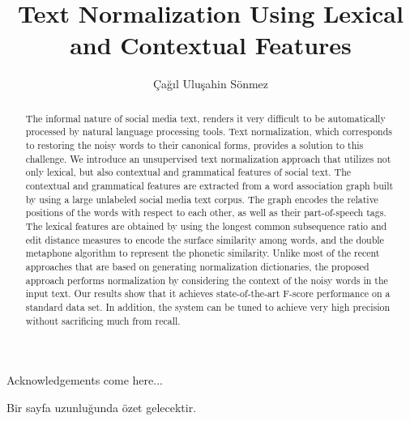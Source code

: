 \documentclass[a4paper,onesided,12pt]{report}
\title{Text Normalization Using Lexical and Contextual Features}
\author{Çağıl Uluşahin Sönmez}
\begin{document}
\makemstitle %
\makeapprovalpage
\begin{acknowledgements}
Acknowledgements come here...
\end{acknowledgements}
\begin{abstract}
The informal nature of social media text, renders it very difficult to be automatically processed by natural language processing tools. Text normalization, which corresponds to restoring the noisy words to their canonical forms, provides a solution to this challenge.
We introduce an unsupervised text normalization approach that utilizes not only lexical, but also contextual and grammatical features of social text.
The contextual and grammatical features are extracted from a word association graph built by using a large unlabeled social media text corpus.
The graph encodes the relative positions of the words with respect to each other, as well as their part-of-speech tags.
The lexical features are obtained by using the longest common subsequence ratio and edit distance measures to encode the surface similarity among words, and the double metaphone algorithm to represent the phonetic similarity. Unlike most of the recent approaches that are based on generating normalization dictionaries, the proposed approach performs normalization by considering the context of the noisy words in the input text.
Our results show that it achieves state-of-the-art F-score performance on a standard data set. In addition, the system can be tuned to achieve very high precision without sacrificing much from recall.
\end{abstract}
\begin{ozet}
Bir sayfa uzunluğunda özet gelecektir.
\end{ozet}
\tableofcontents
\listoffigures
\listoftables
\begin{symbols}
%

\sym{}{}
\sym{ }{}

\end{symbols}
\end{document}
